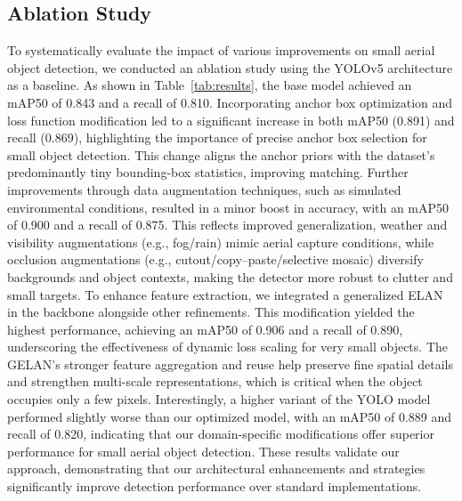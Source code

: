 \documentclass[preprint,review,12pt]{elsarticle}
\begin{document}
\subsection{Ablation Study}
To systematically evaluate the impact of various improvements on small aerial object detection, we conducted an ablation study using the YOLOv5 architecture as a baseline. As shown in Table~\ref{tab:results}, the base model achieved an mAP50 of 0.843 and a recall of 0.810. Incorporating anchor box optimization and loss function modification led to a significant increase in both mAP50 (0.891) and recall (0.869), highlighting the importance of precise anchor box selection for small object detection. This change aligns the anchor priors with the dataset’s predominantly tiny bounding-box statistics, improving matching. Further improvements through data augmentation techniques, such as simulated environmental conditions, resulted in a minor boost in accuracy, with an mAP50 of 0.900 and a recall of 0.875. This reflects improved generalization, weather and visibility augmentations (e.g., fog/rain) mimic aerial capture conditions, while occlusion augmentations (e.g., cutout/copy–paste/selective mosaic) diversify backgrounds and object contexts, making the detector more robust to clutter and small targets. To enhance feature extraction, we integrated a generalized ELAN in the backbone alongside other refinements. This modification yielded the highest performance, achieving an mAP50 of 0.906 and a recall of 0.890, underscoring the effectiveness of dynamic loss scaling for very small objects. The GELAN's stronger feature aggregation and reuse help preserve fine spatial details and strengthen multi-scale representations, which is critical when the object occupies only a few pixels. Interestingly, a higher variant of the YOLO model  performed slightly worse than our optimized model, with an mAP50 of 0.889 and recall of 0.820, indicating that our domain-specific modifications offer superior performance for small aerial object detection. These results validate our approach, demonstrating that our architectural enhancements and strategies significantly improve detection performance over standard implementations.
\end{document}
